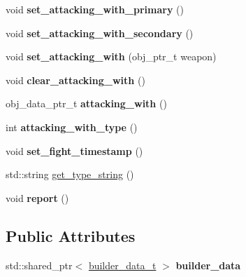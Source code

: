 \begin{DoxyCompactItemize}
\item 
\mbox{\label{classmods_1_1player_a6153d1ba7a90ccb20804409a322d4288}} 
void {\bfseries set\+\_\+attacking\+\_\+with\+\_\+primary} ()
\item 
\mbox{\label{classmods_1_1player_a067cdcd3ffbb193fb864b5720b8d7e6e}} 
void {\bfseries set\+\_\+attacking\+\_\+with\+\_\+secondary} ()
\item 
\mbox{\label{classmods_1_1player_a012244041a3396dc4ba3dc70092c5ea1}} 
void {\bfseries set\+\_\+attacking\+\_\+with} (obj\+\_\+ptr\+\_\+t weapon)
\item 
\mbox{\label{classmods_1_1player_acee88346f8e1bba25d38fcad0527ab3a}} 
void {\bfseries clear\+\_\+attacking\+\_\+with} ()
\item 
\mbox{\label{classmods_1_1player_a674798a3d890110e2aa3d5c52ae579b8}} 
obj\+\_\+data\+\_\+ptr\+\_\+t {\bfseries attacking\+\_\+with} ()
\item 
\mbox{\label{classmods_1_1player_aa35eeea77aca8368ef6e9909e22254ff}} 
int {\bfseries attacking\+\_\+with\+\_\+type} ()
\item 
\mbox{\label{classmods_1_1player_a38890a047f7537df35b34a37b3f30f31}} 
void {\bfseries set\+\_\+fight\+\_\+timestamp} ()
\item 
std\+::string \hyperlink{classmods_1_1player_ab0139ef41b09f35cf6212763e9ff4584}{get\+\_\+type\+\_\+string} ()
\item 
\mbox{\label{classmods_1_1player_a56d250b0bf59bf02bb055b1cca00e81a}} 
void {\bfseries report} ()
\end{DoxyCompactItemize}
\subsection*{Public Attributes}
\begin{DoxyCompactItemize}
\item 
\mbox{\label{classmods_1_1player_a92bf949e9017cba7e15ceeddeecabd6e}} 
std\+::shared\+\_\+ptr$<$ \hyperlink{structbuilder__data__t}{builder\+\_\+data\+\_\+t} $>$ {\bfseries builder\+\_\+data}
\end{DoxyCompactItemize}
